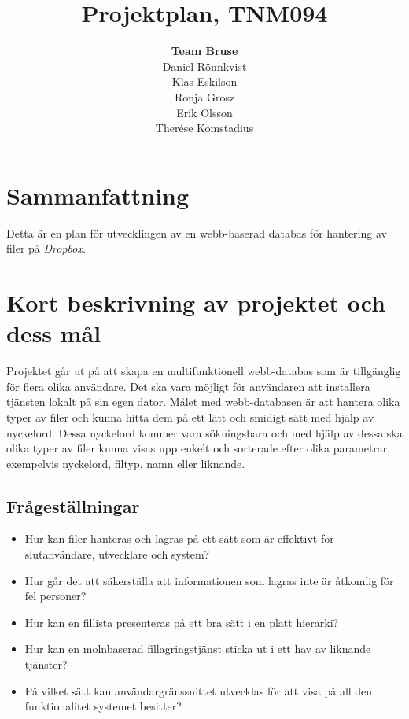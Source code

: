 \documentclass[a4paper,12pt,oneside,final]{extbook}
\title{Projektplan, TNM094}
\author{\textbf{Team Bruse}\\ Daniel Rönnkvist\\ Klas Eskilson\\ Ronja Grosz\\ Erik Olsson \\ Therése Komstadius}
\begin{document}
\pagestyle{empty}
\thispagestyle{empty}

\frontmatter

\maketitle

\pagestyle{fancy}

\chapter{Sammanfattning}

Detta är en plan för utvecklingen av en webb-baserad databas för
hantering av filer på \emph{Dropbox}.

\tableofcontents

\mainmatter

\chapter{Kort beskrivning av projektet och dess mål}

Projektet går ut på att skapa en multifunktionell webb-databas som
är tillgänglig för flera olika användare. Det ska vara möjligt för
användaren att installera tjänsten lokalt på sin egen dator. Målet
med webb-databasen är att hantera olika typer av filer och kunna
hitta dem på ett lätt och smidigt sätt med hjälp av nyckelord. Dessa
nyckelord kommer vara sökningsbara och med hjälp av dessa ska olika
typer av filer kunna visas upp enkelt och sorterade efter olika
parametrar, exempelvis nyckelord, filtyp, namn eller liknande.

\section{Frågeställningar}

\begin{itemize}
\item Hur kan filer hanteras och lagras på ett sätt som är effektivt
      för slutanvändare, utvecklare och system?
\item Hur går det att säkerställa att informationen som lagras inte
      är åtkomlig för fel personer?
\item Hur kan en fillista presenteras på ett bra sätt i en platt
      hierarki?
\item Hur kan en molnbaserad fillagringstjänst sticka ut i ett hav
      av liknande tjänster?
\item På vilket sätt kan användargränssnittet utvecklas för att visa
      på all den funktionalitet systemet besitter?
\end{itemize}
\end{document}
